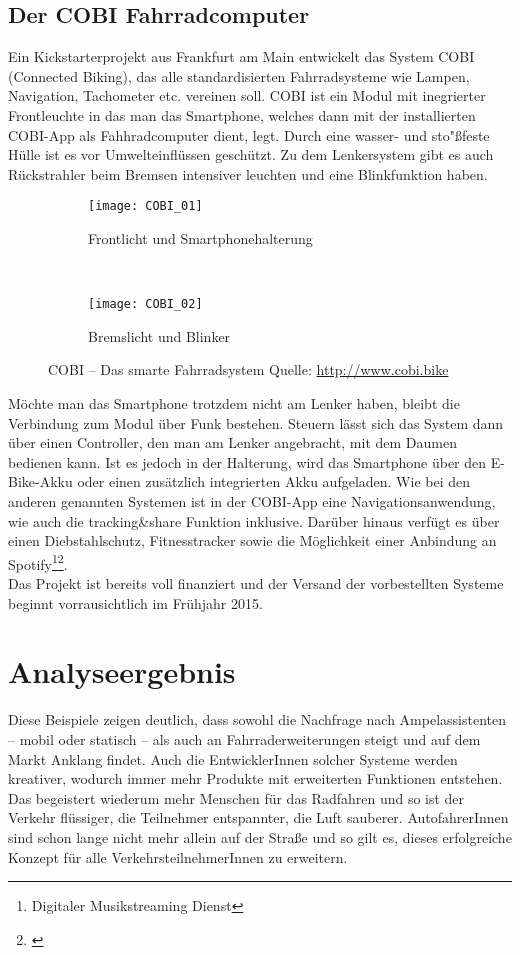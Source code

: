 \subsection{Der COBI Fahrradcomputer}
Ein Kickstarterprojekt aus Frankfurt am Main entwickelt das System \textsc{COBI} (Connected Biking), das alle standardisierten Fahrradsysteme wie Lampen, Navigation, Tachometer etc. vereinen soll. \textsc{COBI} ist ein Modul mit inegrierter Frontleuchte in das man das Smartphone, welches dann mit der installierten \textsc{COBI}-App als Fahhradcomputer dient, legt. Durch eine wasser- und sto"ßfeste Hülle ist es vor Umwelteinflüssen geschützt. Zu dem Lenkersystem gibt es auch Rückstrahler beim Bremsen intensiver leuchten und eine Blinkfunktion haben.
\begin{figure}
        \centering
        \begin{subfigure}[b]{0.5\textwidth}
                \texttt{[image: COBI\_01]}
                \caption{Frontlicht und Smartphonehalterung}
                \label{fig:cobi1}
        \end{subfigure}%
        ~ %
        \begin{subfigure}[b]{0.5\textwidth}
                \texttt{[image: COBI\_02]}
                \caption{Bremslicht und Blinker}
                \label{fig:cobi}
        \end{subfigure}
        \caption{COBI -- Das smarte Fahrradsystem Quelle: \url{http://www.cobi.bike}}\label{fig:cobi}
\end{figure}
Möchte man das Smartphone trotzdem nicht am Lenker haben, bleibt die Verbindung zum Modul über Funk bestehen. Steuern lässt sich das System dann über einen Controller, den man am Lenker angebracht, mit dem Daumen bedienen kann. Ist es jedoch in der Halterung, wird das Smartphone über den E-Bike-Akku oder einen zusätzlich integrierten Akku aufgeladen. Wie bei den anderen genannten Systemen ist in der \textsc{COBI}-App eine Navigationsanwendung, wie auch die tracking&share Funktion inklusive. Darüber hinaus verfügt es über einen Diebstahlschutz, Fitnesstracker sowie die Möglichkeit einer Anbindung an Spotify\footnote{ Digitaler Musikstreaming Dienst}\footnote{\cite{cobi}}.\\
Das Projekt ist bereits voll finanziert und der Versand der vorbestellten Systeme beginnt vorrausichtlich im Frühjahr 2015.
\section{Analyseergebnis}
Diese Beispiele zeigen deutlich, dass sowohl die Nachfrage nach Ampelassistenten -- mobil oder statisch -- als auch an Fahrraderweiterungen steigt und auf dem Markt Anklang findet. Auch die EntwicklerInnen solcher Systeme werden kreativer, wodurch immer mehr Produkte mit erweiterten Funktionen entstehen. Das begeistert wiederum mehr Menschen für das Radfahren und so ist der Verkehr flüssiger, die Teilnehmer entspannter, die Luft sauberer. AutofahrerInnen sind schon lange nicht mehr allein auf der Straße und so gilt es, dieses erfolgreiche Konzept für alle VerkehrsteilnehmerInnen zu erweitern.

